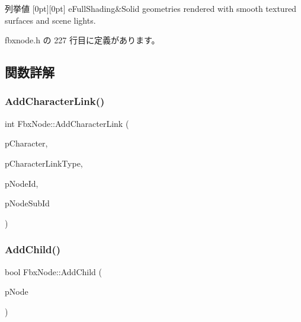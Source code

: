 \begin{DoxyEnumFields}{列挙値}
[0pt][0pt]{}\mbox{\label{class_fbx_node_ab65aa5e41d10dfb4c887667c9a56019daefdf7b2d72751923449653d4a31780b6}} 
e\+Full\+Shading&Solid geometries rendered with smooth textured surfaces and scene lights. \\
\hline

\end{DoxyEnumFields}


 fbxnode.\+h の 227 行目に定義があります。



\subsection{関数詳解}
\mbox{\label{class_fbx_node_ad534d65600668327fe8abdd8f7628c1e}} 
\subsubsection{\texorpdfstring{Add\+Character\+Link()}{AddCharacterLink()}}
{\footnotesize\ttfamily int Fbx\+Node\+::\+Add\+Character\+Link (\begin{DoxyParamCaption}\item[{\hyperlink{class_fbx_character}{Fbx\+Character} $\ast$}]{p\+Character,  }\item[{int}]{p\+Character\+Link\+Type,  }\item[{int}]{p\+Node\+Id,  }\item[{int}]{p\+Node\+Sub\+Id }\end{DoxyParamCaption})}

\mbox{\label{class_fbx_node_af509126aa76e418e12af88a6d92e3475}} 
\subsubsection{\texorpdfstring{Add\+Child()}{AddChild()}}
{\footnotesize\ttfamily bool Fbx\+Node\+::\+Add\+Child (\begin{DoxyParamCaption}\item[{\hyperlink{class_fbx_node}{Fbx\+Node} $\ast$}]{p\+Node }\end{DoxyParamCaption})}

